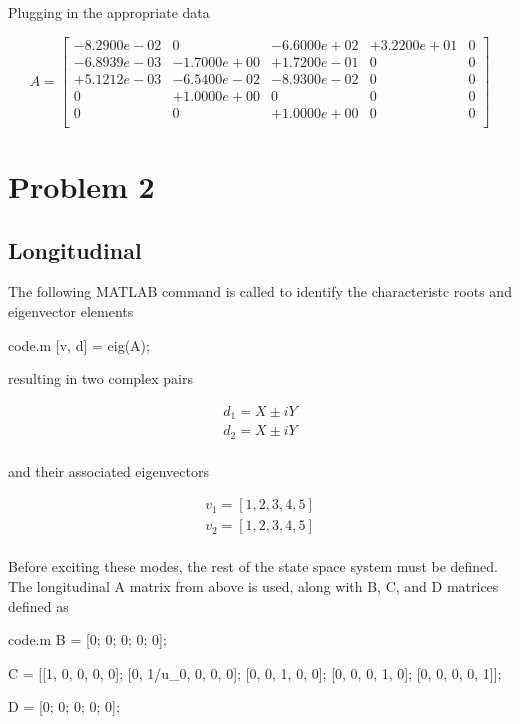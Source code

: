 \documentclass[12pt]{article}
\begin{document}
\noindent Plugging in the appropriate data

\begin{equation*}
A =
\begin{bmatrix}
  -8.2900e-02  &           0  & -6.6000e+02  & +3.2200e+01 &            0 \\
  -6.8939e-03  & -1.7000e+00  & +1.7200e-01  &           0 &            0 \\
  +5.1212e-03  & -6.5400e-02  & -8.9300e-02  &           0 &            0 \\
            0  & +1.0000e+00  &           0  &           0 &            0 \\
            0  &           0  & +1.0000e+00  &           0 &            0 \\
\end{bmatrix}
\end{equation*}

\newpage
\section{Problem 2}
\subsection{Longitudinal}
\noindent The following MATLAB command is called to identify the characteristc roots and eigenvector elements
\begin{filecontents*}{code.m}
[v, d] = eig(A);
\end{filecontents*}


\noindent resulting in two complex pairs

\begin{equation*}
\begin{split}
d_1 = X \pm i Y \\
d_2 = X \pm i Y \\
\end{split}
\end{equation*}

\noindent and their associated eigenvectors

\begin{equation*}
\begin{split}
v_1 = [1, 2, 3, 4, 5] \\
v_2 = [1, 2, 3, 4, 5] \\
\end{split}
\end{equation*}

\noindent Before exciting these modes, the rest of the state space system must be defined. The longitudinal A matrix from above is used, along with B, C, and D matrices defined as
\begin{filecontents*}{code.m}
B = [0; 0; 0; 0; 0];

C = [[1, 0, 0, 0, 0];
     [0, 1/u_0, 0, 0, 0];
     [0, 0, 1, 0, 0];
     [0, 0, 0, 1, 0];
     [0, 0, 0, 0, 1]];

D = [0; 0; 0; 0; 0];
\end{filecontents*}

\end{document}
